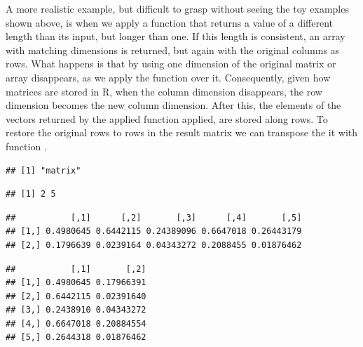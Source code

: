 \documentclass[krantz2,ChapterTOCs]{krantz}\usepackage{knitr}
\begin{document}
\begin{warningbox}
A more realistic example, but difficult to grasp without seeing the toy examples shown above, is when we apply a function that returns a value of a different length than its input, but longer than one. If this length is consistent, an array with matching dimensions is returned, but again with the original columns as rows. What happens is that by using  one dimension of the original matrix or array disappears, as we apply the function over it. Consequently, given how matrices are stored in R, when the column dimension disappears, the row dimension becomes the new column dimension. After this, the elements of the vectors returned by the applied function applied, are stored along rows. To restore the original rows to rows in the result matrix we can transpose the it with function .

\begin{knitrout}\footnotesize
{}\color{fgcolor}\begin{kframe}
\begin{alltt}
\hlstd{(}\hlstd{)}
 \hlkwb{<-} \hlstd{(}\hlstd{(}\hlstd{),}  \hlstd{=} \hlstd{)}
 \hlkwb{<-} \hlstd{(}\hlstd{,}  \hlstd{=} \hlstd{) \{}
       \hlstd{(}      
    \hlstd{\}}
 \hlkwb{<-} \hlstd{(}   \hlstd{=} \hlstd{,}    \hlstd{=} \hlstd{)}
\end{alltt}
\begin{verbatim}
## [1] "matrix"
\end{verbatim}
\begin{alltt}
\end{alltt}
\begin{verbatim}
## [1] 2 5
\end{verbatim}
\begin{alltt}
\end{alltt}
\begin{verbatim}
##           [,1]      [,2]       [,3]      [,4]       [,5]
## [1,] 0.4980645 0.6442115 0.24389096 0.6647018 0.26443179
## [2,] 0.1796639 0.0239164 0.04343272 0.2088455 0.01876462
\end{verbatim}
\begin{alltt}
\end{alltt}
\begin{verbatim}
##           [,1]       [,2]
## [1,] 0.4980645 0.17966391
## [2,] 0.6442115 0.02391640
## [3,] 0.2438910 0.04343272
## [4,] 0.6647018 0.20884554
## [5,] 0.2644318 0.01876462
\end{verbatim}
\end{kframe}
\end{knitrout}


\end{warningbox}
\end{document}
